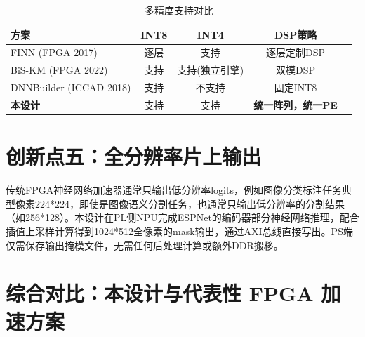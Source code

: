 \documentclass[11pt,a4paper]{article}
\begin{document}
\begin{table}[h]
\centering
\caption{多精度支持对比}
\begin{tabular}{@{}lcccc@{}}
\toprule
方案 & INT8 & INT4 & DSP策略 \\
\midrule
FINN (FPGA 2017) & 逐层 & 支持 & 逐层定制DSP \\
BiS-KM (FPGA 2022) & 支持 & 支持(独立引擎) & 双模DSP \\
DNNBuilder (ICCAD 2018) & 支持 & 不支持 & 固定INT8 \\
\textbf{本设计} & 支持 & 支持 & \textbf{统一阵列，统一PE} \\
\bottomrule
\end{tabular}
\end{table}


\section*{创新点五：全分辨率片上输出}

传统FPGA神经网络加速器通常只输出低分辨率logits，例如图像分类标注任务典型像素224*224，即使是图像语义分割任务，也通常只输出低分辨率的分割结果（如256*128）。本设计在PL侧NPU完成ESPNet的编码器部分神经网络推理，配合插值上采样计算得到1024*512全像素的mask输出，通过AXI总线直接写出。PS端仅需保存输出掩模文件，无需任何后处理计算或额外DDR搬移。


\section*{综合对比：本设计与代表性 FPGA 加速方案}
\end{document}
